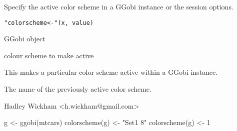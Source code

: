 \begin{Description}\relax
Specify the active color scheme in a GGobi instance or the  session options.
\end{Description}
\begin{Usage}
\begin{verbatim}"colorscheme<-"(x, value)\end{verbatim}
\end{Usage}
\begin{Arguments}
\begin{ldescription}
\item[\code{x}] GGobi object
\item[\code{value}] colour scheme to make active
\end{ldescription}
\end{Arguments}
\begin{Details}\relax
This makes a particular color scheme active within a GGobi instance.
\end{Details}
\begin{Value}
The name of the previously active color scheme.
\end{Value}
\begin{Author}\relax
Hadley Wickham <h.wickham@gmail.com>
\end{Author}
\begin{Examples}
\begin{ExampleCode}g <- ggobi(mtcars)
colorscheme(g) <- "Set1 8"
colorscheme(g) <- 1\end{ExampleCode}
\end{Examples}

